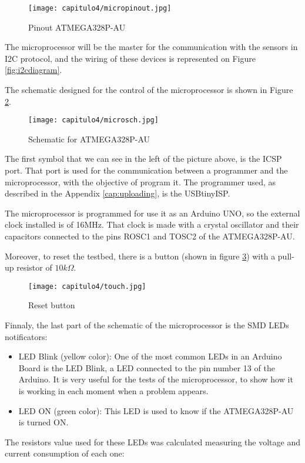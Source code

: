 \begin{figure}[H]
	\centering
		\texttt{[image: capitulo4/micropinout.jpg]}
	\caption{Pinout ATMEGA328P-AU}
	\label{fig:micropinout}
\end{figure}

The microprocessor will be the master for the communication with the sensors in I2C protocol, and the wiring of these devices is represented on Figure \ref{fig:i2cdiagram}.

The schematic designed for the control of the microprocessor is shown in Figure \ref{fig:microsch}.

  
\begin{figure}[H]
	\centering
		\texttt{[image: capitulo4/microsch.jpg]}
	\caption{Schematic for ATMEGA328P-AU}
	\label{fig:microsch}
\end{figure}

The first symbol that we can see in the left of the picture above, is the ICSP port. That port is used for the communication between a programmer and the microprocessor, with the objective of program it. The programmer used, as described in the Appendix \ref{cap:uploading}, is the USBtinyISP. 

The microprocessor is programmed for use it as an Arduino UNO, so the external clock installed is of 16MHz. That clock is made with a crystal oscillator and their capacitors connected to the pins ROSC1 and TOSC2 of the ATMEGA328P-AU.

Moreover, to reset the testbed, there is a button (shown in figure \ref{fig:touch}) with a pull-up resistor of $10k\Omega$. 
\begin{figure}[H]
	\centering
		\texttt{[image: capitulo4/touch.jpg]}
	\caption{Reset button}
	\label{fig:touch}
\end{figure}

Finnaly, the last part of the schematic of the microprocessor is the \acrshort{SMD} LEDs notificators:
\begin{itemize}
\item LED Blink (yellow color):  One of the most common LEDs in an Arduino Board is the LED Blink, a LED connected to the pin number 13 of the Arduino. It is very useful for the tests of the microprocessor, to show how it is working in each moment when a problem appears. 
\item LED ON (green color):  This LED is used to know if the ATMEGA328P-AU is turned ON. 
\end{itemize}
The resistors value used for these LEDs was calculated measuring the voltage and current consumption of each one:

